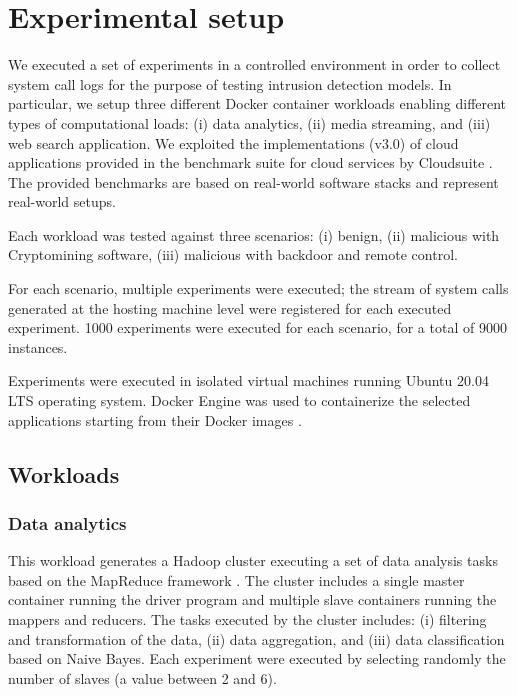 \section{Experimental setup}\label{sec:setup}

We executed a set of experiments in a controlled environment in order to collect system call logs for the purpose of testing intrusion detection models. In particular, we setup three different Docker container workloads enabling different types of computational loads: (i) data analytics, (ii) media streaming, and (iii) web search application. We exploited the implementations (v3.0) of cloud applications provided in the benchmark suite for cloud services by Cloudsuite \cite{palit-demystifying-cloud-benchmarking}. The provided benchmarks are based on real-world software stacks and represent real-world setups.

Each workload was tested against three scenarios: (i) benign, (ii) malicious with Cryptomining software, (iii) malicious with backdoor and remote control.

For each scenario, multiple experiments were executed; the stream of system calls generated at the hosting machine level were registered for each executed experiment. 1000 experiments were executed for each scenario, for a total of 9000 instances.

Experiments were executed in isolated virtual machines running Ubuntu 20.04 LTS operating system. Docker Engine was used to containerize the selected applications starting from their Docker images \cite{merkel2014docker}.

\subsection{Workloads}
\subsubsection{Data analytics}
This workload generates a Hadoop cluster executing a set of data analysis tasks based on the MapReduce framework \cite{dean2008mapreduce}. The cluster includes a single master container running the driver program and multiple slave containers running the mappers and reducers. The tasks executed by the cluster includes: (i) filtering and transformation of the data, (ii)  data aggregation, and (iii) data classification based on Naive Bayes. Each experiment were executed by  selecting randomly the number of slaves (a value between 2 and 6).

